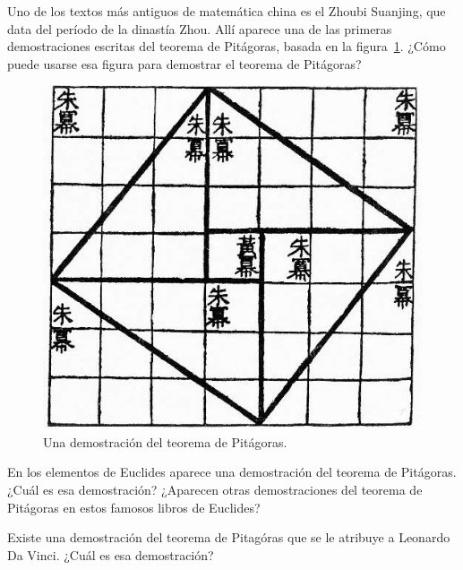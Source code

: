 \begin{exercise}
	Uno de los textos más antiguos de matemática china es el Zhoubi Suanjing,
	que data del período de la dinastía Zhou. Allí aparece una de las primeras
	demostraciones escritas del teorema de Pitágoras, basada en la
	figura~\ref{fig:China}. ¿Cómo puede usarse esa figura para demostrar el
	teorema de Pitágoras?
	\begin{figure}[h]
		\centering
		\includegraphics[scale=0.2]{images/pitagoras_china}
		\caption{Una demostración del teorema de Pitágoras.}
		\label{fig:China}
	\end{figure}
\end{exercise}

\begin{exercise}
	En los elementos de Euclides aparece una demostración del teorema de
	Pitágoras. ¿Cuál es esa demostración? ¿Aparecen otras demostraciones del
	teorema de Pitágoras en estos famosos libros de Euclides?
\end{exercise}

\begin{exercise}
	Existe una demostración del teorema de Pitagóras que se le atribuye a
	Leonardo Da Vinci. ¿Cuál es esa demostración?
\end{exercise}


